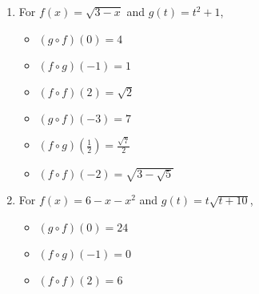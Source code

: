 \begin{enumerate}
\item  For $f(x) = \sqrt{3-x}$ and $g(t) = t^2+1$,
\begin{multicols}{3}

\begin{itemize}

\item  $(g\circ f)(0) = 4$

\item  $(f\circ g)(-1) = 1$

\item  $(f \circ f)(2) = \sqrt{2}$

\end{itemize}

\end{multicols}

\begin{multicols}{3}

\begin{itemize}

\item  $(g\circ f)(-3) = 7$

\item  $(f\circ g)\left(\frac{1}{2}\right) = \frac{\sqrt{7}}{2}$

\item  $(f \circ f)(-2) = \sqrt{3 - \sqrt{5}}$

\end{itemize}

\end{multicols}

\enlargethispage{0.5in}

\item  For  $f(x) = 6-x-x^2$ and $g(t) = t\sqrt{t+10}$,
\begin{multicols}{3}

\begin{itemize}

\item  $(g\circ f)(0) = 24$

\item  $(f\circ g)(-1) = 0$

\item  $(f \circ f)(2) = 6$

\end{itemize}

\end{multicols}

\begin{multicols}{3}

\begin{itemize}


\end{itemize}
\end{multicols}
\end{enumerate}
